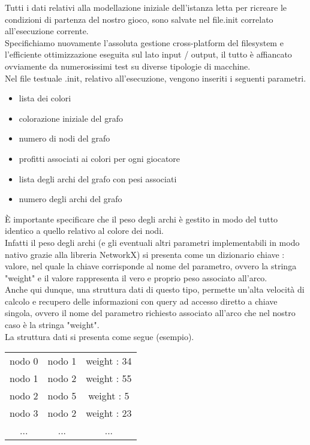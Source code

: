 Tutti i dati relativi alla modellazione iniziale dell'istanza letta per ricreare le condizioni di partenza del nostro gioco, sono salvate nel file.init correlato all'esecuzione corrente.\\
Specifichiamo nuovamente l'assoluta gestione cross-platform del filesystem e l'efficiente ottimizzazione eseguita sul lato input / output, il tutto è affiancato ovviamente da numerosissimi test su diverse tipologie di macchine.\\

Nel file testuale .init, relativo all'esecuzione, vengono inseriti i seguenti parametri.

\begin{itemize}
	\item lista dei colori
	\item colorazione iniziale del grafo
	\item numero di nodi del grafo
	\item profitti associati ai colori per ogni giocatore
	\item lista degli archi del grafo con pesi associati
	\item numero degli archi del grafo
\end{itemize}

È importante specificare che il peso degli archi è gestito in modo del tutto identico a quello relativo al colore dei nodi.\\
Infatti il peso degli archi (e gli eventuali altri parametri implementabili in modo nativo grazie alla libreria NetworkX) si presenta come un dizionario chiave : valore, nel quale la chiave corrisponde al nome del parametro, ovvero la stringa "weight" e il valore rappresenta il vero e proprio peso associato all'arco.\\

Anche qui dunque, una struttura dati di questo tipo, permette un'alta velocità di calcolo e recupero delle informazioni con query ad accesso diretto a chiave singola, ovvero il nome del parametro richiesto associato all'arco che nel nostro caso è la stringa "weight".\\
La struttura dati si presenta come segue (esempio).

\begin{table}[H]
\centering
\begin{tabular}{ccc}
nodo 0 & nodo 1 & weight : 34 \\
nodo 1 & nodo 2 & weight : 55 \\
nodo 2 & nodo 5 & weight : 5 \\
nodo 3 & nodo 2 & weight : 23 \\
... & ... & ...
\end{tabular}
\end{table}

